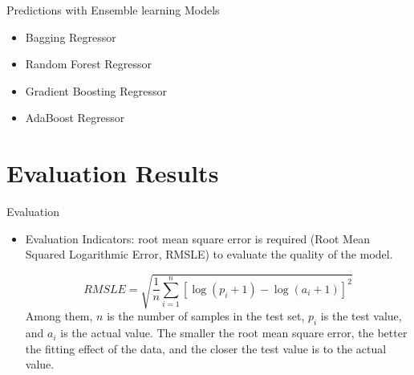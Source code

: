 \documentclass[
 size=14pt,
 paper=smartboard,  %
 mode=present, 		%
 display=slides, 	%
 style=tuliplab,  	%
 pauseslide,
 fleqn,leqno]{powerdot}
\begin{document}
\begin{slide}[toc=,bm=]{Predictions with Ensemble learning Models}
\begin{itemize}
  \item Bagging Regressor
  \item Random Forest Regressor
  \item Gradient Boosting Regressor
  \item AdaBoost Regressor
  
  \end{itemize}

\end{slide}



\section{Evaluation Results}


\begin{slide}[toc=,bm=]{Evaluation}

\begin{center}
\begin{itemize}

\item Evaluation Indicators: root mean square error is required (Root Mean Squared Logarithmic Error, RMSLE) to evaluate the quality of the model. 
\smallskip

{$$ RMSLE = \sqrt{\frac{1}{n} \sum_{i=1}^n [\log(p_i + 1) - \log(a_i + 1)]^2} $$}
Among them, $n$ is the number of samples in the test set, $p_i$ is the test value, and $a_i$ is the actual value. The smaller the root mean square error, the better the fitting effect of the data, and the closer the test value is to the actual value.
\end{itemize}
\end{center}

\end{slide}
\end{document}
